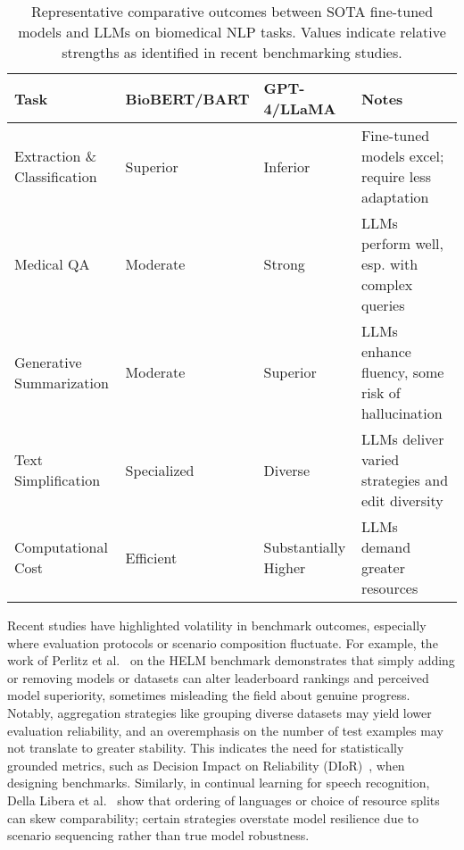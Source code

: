 \documentclass[sigconf]{acmart}
\begin{document}
\begin{table*}[htbp]
\centering
\caption{Representative comparative outcomes between SOTA fine-tuned models and LLMs on biomedical NLP tasks. Values indicate relative strengths as identified in recent benchmarking studies.}
\label{tab:method_comparison}
\begin{adjustbox}{max width=\textwidth}
\begin{tabular}{@{}llll@{}}
\toprule
\textbf{Task} & \textbf{BioBERT/BART} & \textbf{GPT-4/LLaMA} & \textbf{Notes} \\
\midrule
Extraction \& Classification    & Superior         & Inferior          & Fine-tuned models excel; require less adaptation \\
Medical QA                     & Moderate         & Strong            & LLMs perform well, esp. with complex queries \\
Generative Summarization       & Moderate         & Superior          & LLMs enhance fluency, some risk of hallucination \\
Text Simplification            & Specialized      & Diverse           & LLMs deliver varied strategies and edit diversity \\
Computational Cost             & Efficient        & Substantially Higher & LLMs demand greater resources \\
\bottomrule
\end{tabular}
\end{adjustbox}
\end{table*}

Recent studies have highlighted volatility in benchmark outcomes, especially where evaluation protocols or scenario composition fluctuate. For example, the work of Perlitz et al.~\cite{ref104} on the HELM benchmark demonstrates that simply adding or removing models or datasets can alter leaderboard rankings and perceived model superiority, sometimes misleading the field about genuine progress. Notably, aggregation strategies like grouping diverse datasets may yield lower evaluation reliability, and an overemphasis on the number of test examples may not translate to greater stability. This indicates the need for statistically grounded metrics, such as Decision Impact on Reliability (DIoR)~\cite{ref104}, when designing benchmarks. Similarly, in continual learning for speech recognition, Della Libera et al.~\cite{ref102} show that ordering of languages or choice of resource splits can skew comparability; certain strategies overstate model resilience due to scenario sequencing rather than true model robustness.
\end{document}
